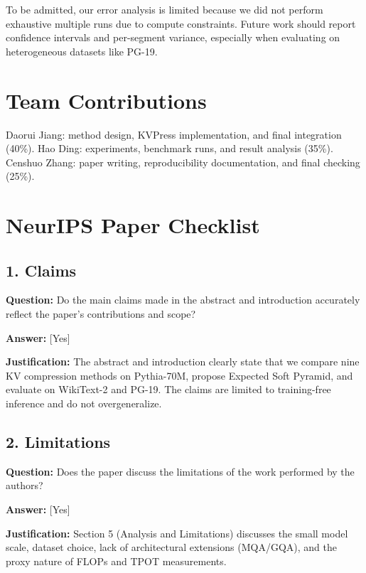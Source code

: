 \documentclass{article}
\begin{document}
To be admitted, our error analysis is limited because we did not perform exhaustive multiple runs due to compute constraints. Future work should report confidence intervals and per-segment variance, especially when evaluating on heterogeneous datasets like PG-19.

\section{Team Contributions}

Daorui Jiang: method design, KVPress implementation, and final integration (40\%). Hao Ding: experiments, benchmark runs, and result analysis (35\%). Censhuo Zhang: paper writing, reproducibility documentation, and final checking (25\%).





\section*{NeurIPS Paper Checklist}

\subsection*{1. Claims}

\textbf{Question:} Do the main claims made in the abstract and introduction accurately reflect the paper's contributions and scope?

\textbf{Answer:} [Yes]

\textbf{Justification:} The abstract and introduction clearly state that we compare nine KV compression methods on Pythia-70M, propose Expected Soft Pyramid, and evaluate on WikiText-2 and PG-19. The claims are limited to training-free inference and do not overgeneralize.

\subsection*{2. Limitations}

\textbf{Question:} Does the paper discuss the limitations of the work performed by the authors?

\textbf{Answer:} [Yes]

\textbf{Justification:} Section 5 (Analysis and Limitations) discusses the small model scale, dataset choice, lack of architectural extensions (MQA/GQA), and the proxy nature of FLOPs and TPOT measurements.
\end{document}
